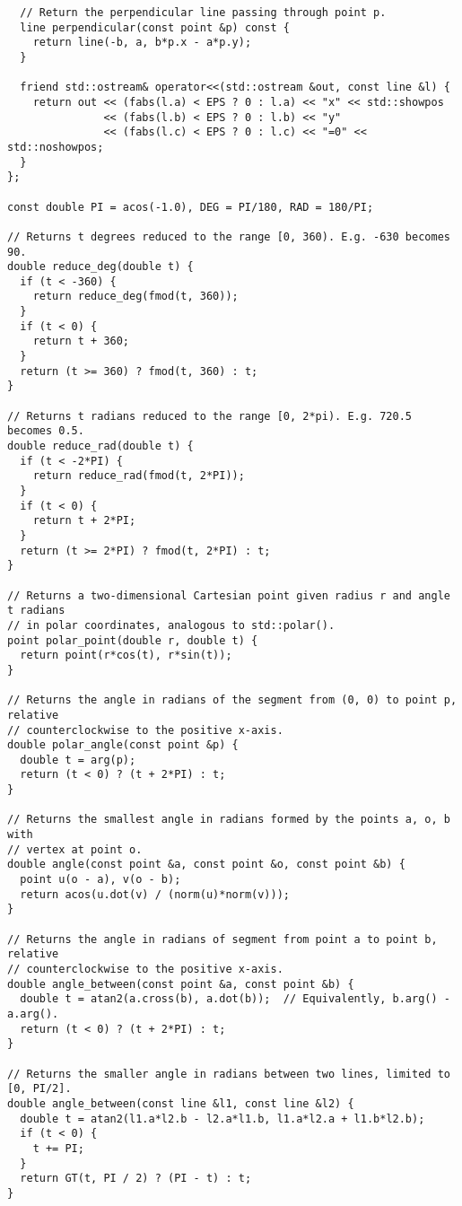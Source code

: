 \begin{lstlisting}
  // Return the perpendicular line passing through point p.
  line perpendicular(const point &p) const {
    return line(-b, a, b*p.x - a*p.y);
  }

  friend std::ostream& operator<<(std::ostream &out, const line &l) {
    return out << (fabs(l.a) < EPS ? 0 : l.a) << "x" << std::showpos
               << (fabs(l.b) < EPS ? 0 : l.b) << "y"
               << (fabs(l.c) < EPS ? 0 : l.c) << "=0" << std::noshowpos;
  }
};

const double PI = acos(-1.0), DEG = PI/180, RAD = 180/PI;

// Returns t degrees reduced to the range [0, 360). E.g. -630 becomes 90.
double reduce_deg(double t) {
  if (t < -360) {
    return reduce_deg(fmod(t, 360));
  }
  if (t < 0) {
    return t + 360;
  }
  return (t >= 360) ? fmod(t, 360) : t;
}

// Returns t radians reduced to the range [0, 2*pi). E.g. 720.5 becomes 0.5.
double reduce_rad(double t) {
  if (t < -2*PI) {
    return reduce_rad(fmod(t, 2*PI));
  }
  if (t < 0) {
    return t + 2*PI;
  }
  return (t >= 2*PI) ? fmod(t, 2*PI) : t;
}

// Returns a two-dimensional Cartesian point given radius r and angle t radians
// in polar coordinates, analogous to std::polar().
point polar_point(double r, double t) {
  return point(r*cos(t), r*sin(t));
}

// Returns the angle in radians of the segment from (0, 0) to point p, relative
// counterclockwise to the positive x-axis.
double polar_angle(const point &p) {
  double t = arg(p);
  return (t < 0) ? (t + 2*PI) : t;
}

// Returns the smallest angle in radians formed by the points a, o, b with
// vertex at point o.
double angle(const point &a, const point &o, const point &b) {
  point u(o - a), v(o - b);
  return acos(u.dot(v) / (norm(u)*norm(v)));
}

// Returns the angle in radians of segment from point a to point b, relative
// counterclockwise to the positive x-axis.
double angle_between(const point &a, const point &b) {
  double t = atan2(a.cross(b), a.dot(b));  // Equivalently, b.arg() - a.arg().
  return (t < 0) ? (t + 2*PI) : t;
}

// Returns the smaller angle in radians between two lines, limited to [0, PI/2].
double angle_between(const line &l1, const line &l2) {
  double t = atan2(l1.a*l2.b - l2.a*l1.b, l1.a*l2.a + l1.b*l2.b);
  if (t < 0) {
    t += PI;
  }
  return GT(t, PI / 2) ? (PI - t) : t;
}


\end{lstlisting}
